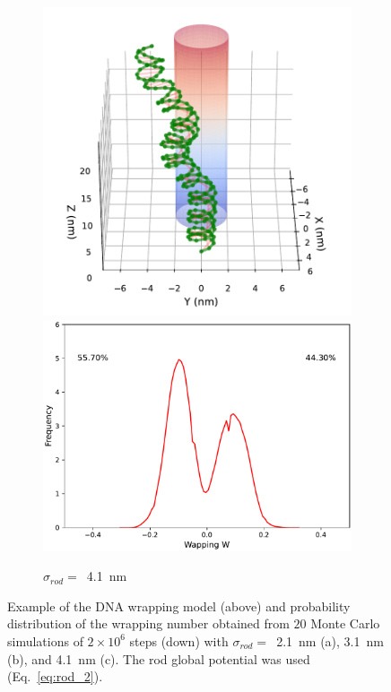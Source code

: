 \documentclass[a4paper,10pt]{article}
\begin{document}
\begin{figure}[tb]
\begin{subfigure}{.3\textwidth}
\includegraphics[width=\textwidth]{r2_C_2000000_18.pdf}
\includegraphics[width=\textwidth]{r2_C_wr_pr.pdf}
\caption{$\sigma_{rod}=$~\SI{4.1}{\nm}}
\label{fig:r2_c}
\end{subfigure}
\caption{Example of the DNA wrapping model (above) and probability distribution of the wrapping number obtained from $20$ Monte Carlo simulations of $2\times 10^6$ steps (down) with $\sigma_{rod}=$~\SI{2.1}{\nm} (a), \SI{3.1}{\nm} (b), and \SI{4.1}{\nm} (c). The rod global potential was used (Eq.~\ref{eq:rod_2}).}
\label{fig:r2}
\end{figure}
\end{document}
